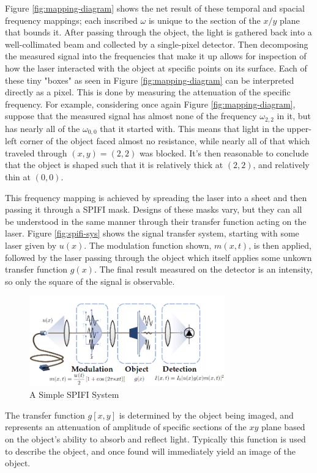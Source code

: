 \documentclass[12pt]{article}
\begin{document}
Figure \ref{fig:mapping-diagram} shows the net result of these temporal and spacial frequency mappings;
each inscribed $\omega$ is unique to the section of the
$x/y$ plane that bounds it. After passing through the object, the light is gathered back into a well-collimated beam and collected by a single-pixel detector. Then decomposing the measured signal into the frequencies that make it up allows for inspection of how the laser interacted with the object at specific points on its surface. Each of these tiny "boxes" as seen in Figure \ref{fig:mapping-diagram} can be interpreted directly as a pixel. This is done by measuring the attenuation of the specific frequency. For example, considering once again Figure \ref{fig:mapping-diagram}, suppose that the measured signal has almost none of the frequency $\omega_{2,2}$ in it, but has nearly all of the $\omega_{0,0}$ that it started with. This means that light in the upper-left corner of the object faced almost no resistance, while nearly all of that which traveled through $(x,y)=(2,2)$ was blocked. It's then reasonable to conclude that the object is shaped such that it is relatively thick at $(2,2)$, and relatively thin at $(0,0)$.


This frequency mapping is achieved by spreading the laser into a sheet and then passing it through a SPIFI mask. Designs of these masks vary, but they can all be understood in the same manner through their transfer function acting on the laser. Figure \ref{fig:spifi-sys} shows the signal transfer system, starting with some laser given by $u(x)$. The modulation function shown, $m(x,t)$, is then applied, followed by the laser passing through the object which itself applies some unkown transfer function $g(x)$. The final result measured on the detector is an intensity, so only the square of the signal is observable.

\begin{figure}[ht]
\centering
\includegraphics[width=0.75\textwidth]{spifi-system-graphical}
\caption{A Simple SPIFI System}
\label{fig:spif-sys}
\end{figure}
The transfer function $g[x,y]$ is determined
by the object being
imaged, and represents an attenuation of amplitude of specific sections of the
$xy$ plane based on the object's ability to absorb and reflect light.
Typically this function is used to describe the object, and once found will immediately yield an image of the object.
\end{document}
